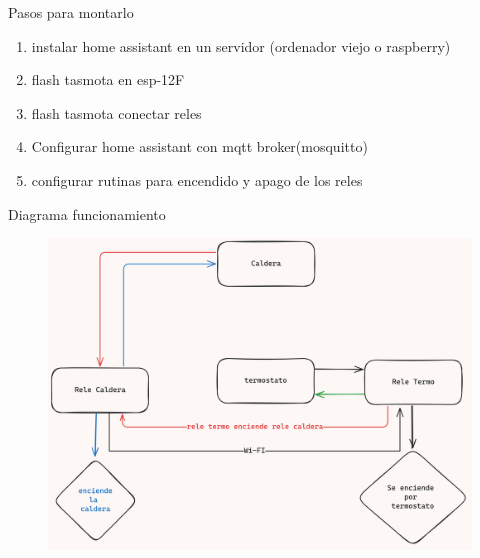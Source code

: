 \documentclass{report}
\begin{document}
  Pasos para montarlo
\begin{enumerate}
  \item instalar home assistant en un servidor (ordenador viejo o raspberry)
  \item flash tasmota en esp-12F
  \item flash tasmota conectar reles 
  \item Configurar home assistant con mqtt broker(mosquitto)
  \item configurar rutinas para encendido y apago de los reles
\end{enumerate}
\newpage
Diagrama funcionamiento
\begin{figure}[h]
  \centering
  \includegraphics[width=\textwidth]{figures/diagrama.png}
\end{figure}
\end{document}
